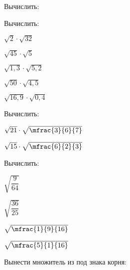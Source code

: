 \begin{class}[number=3]
\begin{listofex}
\begin{enumcols}[itemcolumns=3]
%			
		\end{enumcols}
		\item Вычислить:
		\begin{enumcols}[itemcolumns=3]
			\item {}
			\item {}
			\item {}
		\end{enumcols}
		\item Вычислить:
		\begin{enumcols}[itemcolumns=5]
			\item \( \sqrt{2}\cdot\sqrt{32} \)
			\item \( \sqrt{45}\cdot\sqrt{5} \)
			\item \( \sqrt{1,3}\cdot\sqrt{5,2} \)
			\item \( \sqrt{50}\cdot\sqrt{4,5} \)
			\item \( \sqrt{16,9}\cdot\sqrt{0,4} \)
		\end{enumcols}
		\item Вычислить:
		\begin{enumcols}[itemcolumns=4]
			\item \( \sqrt{21}\cdot\sqrt{\mfrac{3}{6}{7}} \)
			\item \( \sqrt{15}\cdot\sqrt{\mfrac{6}{2}{3}} \)
			\item {}
			\item {}
		\end{enumcols}
		\item Вычислить:
		\begin{enumcols}[itemcolumns=4]
			\item \( \sqrt{\dfrac{9}{64}} \)
			\item \( \sqrt{\dfrac{36}{25}} \)
			\item \( \sqrt{\mfrac{1}{9}{16}} \)
			\item \( \sqrt{\mfrac{5}{1}{16}} \)
			\item {}
			\item {}
			\item {}
			\item {}
		\end{enumcols}
		\item Вынести множитель из под знака корня:

\end{listofex}
\end{class}
